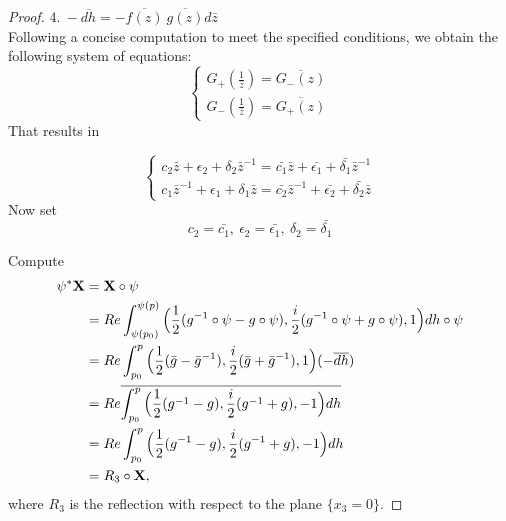\documentclass[11pt]{amsart}
\numberwithin{equation}{section}
\theoremstyle{theorem}
\theoremstyle{definition}
\numberwithin{equation}{section}
\begin{document}
\begin{proof}
  $
 4.\  -\overline{dh}=-\overline{f(z)}\ \overline{g(z)} d\bar{z}
  $\\
  
 Following a concise computation to meet the specified conditions, we obtain the following system of equations:
   \begin{equation}
      \nonumber
      \begin{cases}
           G_+(\frac{1}{\bar{z}})=\overline{G_-(z)} \\
           G_-(\frac{1}{\bar{z}})=\overline{G_+(z)}
      \end{cases}
   \end{equation}
  That results in
  
  \begin{equation}
      \nonumber \begin{cases} c_2\bar{z}+\epsilon_2+\delta_2\bar{z}^{-1}=\bar{c_1}\bar{z}+\bar{\epsilon_1}+\bar{\delta_1}\bar{z}^{-1}\\ c_1\bar{z}^{-1}+\epsilon_1+\delta_1\bar{z}=\bar{c_2}\bar{z}^{-1}+\bar{\epsilon_2}+\bar{\delta_2}\bar{z} 
     \end{cases}
   \end{equation}
   Now set 
   $$
   c_2=\bar{c_1},\ \epsilon_2=\bar{\epsilon_1},\ \delta_2=\bar{\delta_1}
   $$
  
  Compute  
  \begin{equation}
  \nonumber
  \begin{split}
  \psi^*\bold{X} &= \bold{X}\circ \psi\\
  &= Re \int_{\psi(p_0)}^{\psi(p)} \Big( \frac{1}{2}(g^{-1}\circ \psi -g\circ \psi ),\frac{i}{2}(g^{-1}\circ \psi +g\circ \psi ),1    \Big)dh\circ \psi \\
  &=Re \int_{p_0}^p \Big( \frac{1}{2}(\bar{g}-\bar{g}^{-1}),\frac{i}{2}(\bar{g}+\bar{g}^{-1}),1    \Big)(-\overline{dh})\\
  &=Re \overline{\int_{p_0}^p \Big( \frac{1}{2}(g^{-1}-g),\frac{i}{2}(g^{-1}+g),-1    \Big)dh}\\
  &=Re \int_{p_0}^p \Big( \frac{1}{2}(g^{-1}-g),\frac{i}{2}(g^{-1}+g),-1    \Big)dh \\
  &=R_3\circ \bold{X},
   \end{split}
  \end{equation}
  where $R_3$ is the reflection with respect to the plane $\{x_3=0\}$.
\end{proof}
\end{document}
